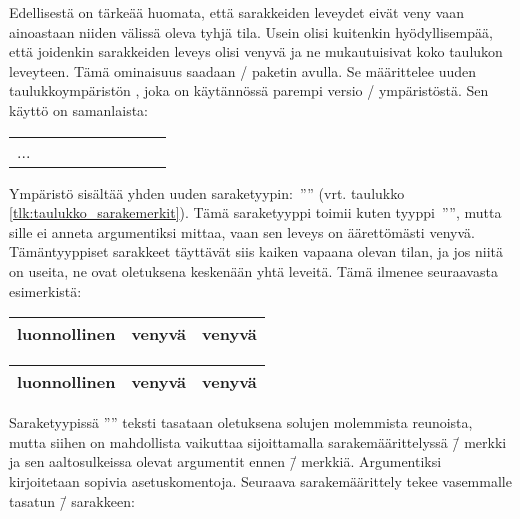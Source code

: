 Edellisestä on tärkeää huomata, että sarakkeiden leveydet eivät veny
vaan ainoastaan niiden välissä oleva tyhjä tila. Usein olisi kuitenkin
hyödyllisempää, että joidenkin sarakkeiden leveys olisi venyvä ja ne
mukautuisivat koko taulukon leveyteen. Tämä ominaisuus saadaan
\-/ paketin avulla. Se määrittelee
uuden taulukkoympäristön , joka on käytännössä
parempi versio \-/ ympäristöstä. Sen käyttö on
samanlaista:

\begin{koodilohkosis}
\begin{tabularx}{leveys}[sijainti]{sarakkeet}
  ...
\end{tabularx}
\end{koodilohkosis}

Ympäristö  sisältää yhden uuden
saraketyypin:~'''' (vrt. taulukko
\ref{tlk:taulukko_sarakemerkit}). Tämä saraketyyppi toimii kuten
tyyppi~'''', mutta sille ei anneta argumentiksi mittaa, vaan
sen leveys on äärettömästi venyvä. Tämäntyyppiset sarakkeet täyttävät
siis kaiken vapaana olevan tilan, ja jos niitä on useita, ne ovat
oletuksena keskenään yhtä leveitä. Tämä ilmenee seuraavasta esimerkistä:

\begin{koodilohkosis}
\begin{tabularx}{\linewidth}{|l|X|X|}
  \hline luonnollinen & venyvä & venyvä \\ \hline
\end{tabularx}
\end{koodilohkosis}

\begin{tulossis}
  \renewcommand{\arraystretch}{1.2}
  \begin{tabularx}{\linewidth}{|l|X|X|}
    \hline luonnollinen & venyvä & venyvä \\ \hline
  \end{tabularx}
\end{tulossis}

Saraketyypissä '''' teksti tasataan oletuksena solujen
molemmista reunoista, mutta siihen on mahdollista vaikuttaa
sijoittamalla sarakemäärittelyssä \koodi{>}\=/ merkki ja sen
aaltosulkeissa olevat argumentit ennen \=/ merkkiä.
Argumentiksi kirjoitetaan sopivia asetuskomentoja. Seuraava
sarakemäärittely tekee vasemmalle tasatun \=/ sarakkeen:

